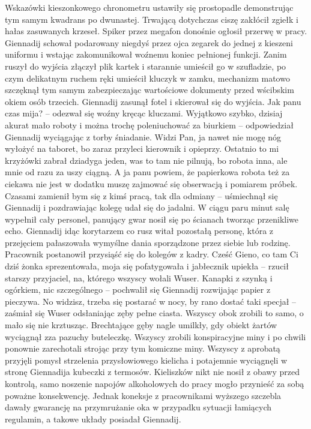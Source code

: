 \documentclass[../MAIN.tex]{subfiles}
\begin{document}
% 
Wskazówki kieszonkowego chronometru ustawiły się prostopadle demonstrując tym samym kwadrans po dwunastej. Trwającą dotychczas ciszę zakłócił zgiełk i hałas zasuwanych krzeseł. Spiker przez megafon donośnie ogłosił przerwę w pracy. Giennadij schował podarowany niegdyś przez ojca zegarek do jednej z kieszeni uniformu i wstając zakomunikował woźnemu koniec pełnionej funkcji. Zanim ruszył do wyjścia złączył plik kartek i starannie umieścił go w szufladzie, po czym delikatnym ruchem ręki umieścił kluczyk w zamku, mechanizm matowo szczęknął tym samym zabezpieczając wartościowe dokumenty przed wścibskim okiem osób trzecich. Giennadij zasunął fotel i skierował się do wyjścia. 
\sx
Jak panu czas mija? -- odezwał się woźny kręcąc kluczami. 
\xx Wyjątkowo szybko, dzisiaj akurat mało roboty i można trochę poleniuchować za biurkiem -- odpowiedział Giennadij wyciągając z torby śniadanie. 
\xx Widzi Pan, ja nawet nie mogę nóg wyłożyć na taboret, bo zaraz przyleci kierownik i opieprzy. Ostatnio to mi krzyżówki zabrał dziadyga jeden, was to tam nie pilnują, bo robota inna, ale mnie od razu za uszy ciągną. 
\xx A ja panu powiem, że papierkowa robota też za ciekawa nie jest w dodatku muszę zajmować się obserwacją i pomiarem próbek. Czasami zamienił bym się z kimś pracą, tak dla odmiany -- uśmiechnął się Giennadij i pozdrawiając kolegę udał się do jadalni. 
\qd
W ciągu paru minut salę wypełnił cały personel, panujący gwar nosił się po ścianach tworząc przenikliwe echo. Giennadij idąc korytarzem co rusz witał pozostałą personę, która z przejęciem pałaszowała wymyślne dania sporządzone przez siebie lub rodzinę. Pracownik postanowił przysiąść się do kolegów z kadry. 
\sx
Cześć Gieno, co tam Ci dziś żonka sprezentowała, moja się pofatygowała i jabłecznik upiekła -- rzucił starszy przyjaciel, na, którego wszyscy wołali Wuser. 
\xx Kanapki z szynką i ogórkiem, nic szczególnego -- pochwalił się Giennadij rozwijając papier z pieczywa. 
\xx No widzisz, trzeba się postarać w nocy, by rano dostać taki specjał -- zaśmiał się Wuser odsłaniając zęby pełne ciasta. 
\qd
Wszyscy obok zrobili to samo, o mało się nie krztusząc. Brechtające gęby nagle umilkły, gdy obiekt żartów wyciągnął zza pazuchy buteleczkę. Wszyscy zrobili konspiracyjne miny i po chwili ponownie zarechotali strojąc przy tym komiczne miny. Wszyscy z aprobatą przyjęli pomysł strzelenia przysłowiowego kielicha i potajemnie wyciągnęli w stronę Giennadija kubeczki z termosów. Kieliszków nikt nie nosił z obawy przed kontrolą, samo noszenie napojów alkoholowych do pracy mogło przynieść za sobą poważne konsekwencję. Jednak koneksje z pracownikami wyższego szczebla dawały gwarancję na przymrużanie oka w przypadku sytuacji łamiących regulamin, a takowe układy posiadał Giennadij. 
\end{document}
